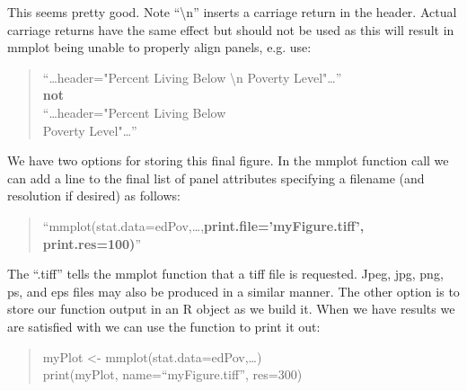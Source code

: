 \documentclass{article}
\begin{document}
This seems pretty good. Note ``\textbackslash n'' inserts a carriage return in the header. Actual carriage returns have the same effect but should not be used as this will result in mmplot being unable to properly align panels, e.g. use: 
\begin{quote}
``\dots header="Percent Living Below \textbackslash n Poverty Level"\dots''\\
\textbf{not}\\
``\dots header="Percent Living Below\\ 
    Poverty Level"\dots''
\end{quote}
We have two options for storing this final figure. In the mmplot function call we can add a line to the final list of panel attributes specifying a filename (and resolution if desired) as follows:
\begin{quote}
``mmplot(stat.data=edPov,\dots,\textbf{print.file='myFigure.tiff', print.res=100)}''
\end{quote}
The ``.tiff'' tells the mmplot function that a tiff file is requested. Jpeg, jpg,  png, ps, and eps files may also be produced in a similar manner. The other option is to store our function output in an R object as we build it. When we have results
we are satisfied with we can use the \verb@printmmplot@ function to print it out:
\begin{quote}
myPlot <- mmplot(stat.data=edPov,\dots)\\
print(myPlot, name=``myFigure.tiff'', res=300)
\end{quote}
\end{document}
